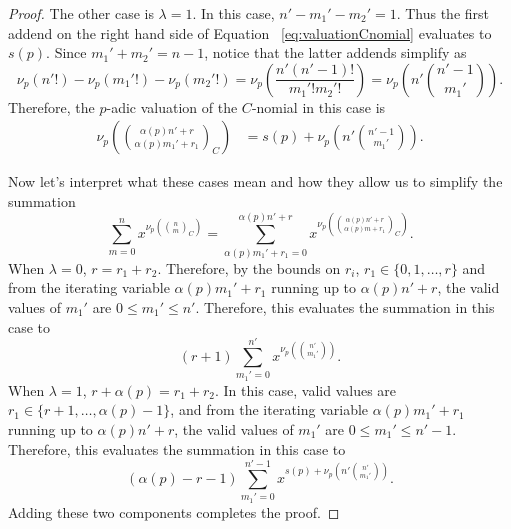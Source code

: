 \documentclass[10pt,a4paper]{amsart}
\begin{document}
\begin{proof}
The other case is $\lambda=1$.
In this case, $n'-m_1'-m_2'=1$. Thus the first addend on the right hand side of Equation ~\eqref{eq:valuationCnomial} evaluates to $s(p)$. Since $m_1'+m_2'=n-1$, notice that the latter addends simplify as 
$$\nu_p\left(n'!\right) - \nu_p\left(m_1'!\right) - \nu_p\left(m_2'!\right)= \nu_p\left(\frac{n' (n'-1)!}{m_1'! m_2'!}\right)= \nu_p\!\left(n'\binom {n'-1} {m_1'}\right).$$
Therefore, the $p$-adic valuation of the $C$-nomial in this case is
\begin{align*}
    \nu_p\!\left(\binom{\alpha(p)n'+r}{\alpha(p)m_1'+r_1}_C\right) &= s(p)+\nu_p\!\left(n'\binom{n'-1}{m_1'}\right).
\end{align*}

Now let's interpret what these cases mean and how they allow us to simplify the summation 
$$\sum_{m=0}^{n} x^{\nu_p\!\left( \binom{n}{m}_C \right)} = \sum_{\alpha(p)m_1'+r_1=0}^{\alpha(p)n'+r} x^{\nu_p\!\left(\binom{\alpha(p)n'+r}{\alpha(p)m+r_1}_C\right)}. $$ 
When $\lambda=0$, $r=r_1+r_2$. Therefore, by the bounds on $r_i$, $r_1\in\{0,1,\ldots,r\}$ and from the iterating variable $\alpha(p)m_1' + r_1$ running up to $\alpha(p)n'+r$, the valid values of $m_1'$ are $0 \leq m_1' \leq n'$. Therefore, this evaluates the summation in this case to $$(r+1)\sum_{m_1'=0}^{n'} x^{\nu_p\!\left(\binom{n'}{m_1'}\right)}.$$
When $\lambda=1$, $r+\alpha(p)=r_1+r_2$. In this case, valid values are $r_1\in\{r+1, \ldots,\alpha(p)-1\}$, and from the iterating variable $\alpha(p)m_1' + r_1$ running up to $\alpha(p)n'+r$, the valid values of $m_1'$ are $0 \leq m_1' \leq n'-1$. Therefore, this evaluates the summation in this case to $$(\alpha(p)-r-1)\sum_{m_1'=0}^{n'-1} x^{s(p)+\nu_p\!\left(n'\binom{n'}{m_1'}\right)}.$$
Adding these two components completes the proof.
\end{proof}
\end{document}
